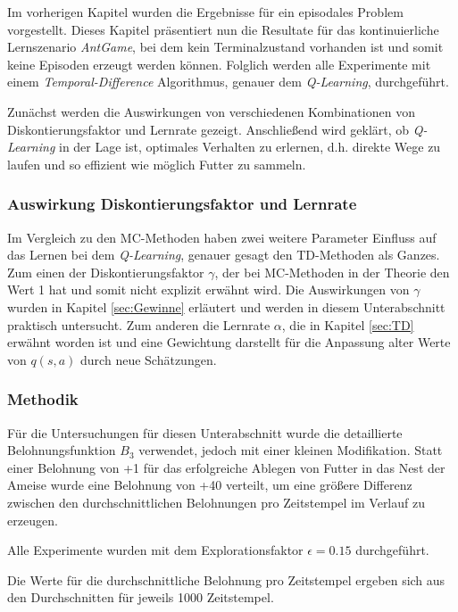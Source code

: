 Im vorherigen Kapitel wurden die Ergebnisse für ein episodales Problem vorgestellt. Dieses Kapitel präsentiert nun die Resultate für das kontinuierliche Lernszenario \textit{AntGame}, bei dem kein Terminalzustand vorhanden ist und somit keine Episoden erzeugt werden können. Folglich werden alle Experimente mit einem \textit{Temporal-Difference} Algorithmus, genauer dem \textit{Q-Learning}, durchgeführt. 
\par 
Zunächst werden die Auswirkungen von verschiedenen Kombinationen von Diskontierungsfaktor und Lernrate gezeigt. Anschließend wird geklärt, ob \textit{Q-Learning} in der Lage ist, optimales Verhalten zu erlernen, d.h. direkte Wege zu laufen und so effizient wie möglich Futter zu sammeln.


\subsubsection{Auswirkung Diskontierungsfaktor und Lernrate}
Im Vergleich zu den MC-Methoden haben zwei weitere Parameter Einfluss auf das Lernen bei dem \textit{Q-Learning}, genauer gesagt den TD-Methoden als Ganzes. Zum einen der Diskontierungsfaktor $\gamma$, der bei MC-Methoden in der Theorie den Wert 1 hat und somit nicht explizit erwähnt wird. Die Auswirkungen von $\gamma$ wurden in Kapitel \ref{sec:Gewinne} erläutert und werden in diesem Unterabschnitt praktisch untersucht. Zum anderen die Lernrate $\alpha$, die in Kapitel \ref{sec:TD} erwähnt worden ist und eine Gewichtung darstellt für die Anpassung alter Werte von $q(s,a)$ durch neue Schätzungen.

\subsubsection*{Methodik}
Für die Untersuchungen für diesen Unterabschnitt wurde die detaillierte Belohnungsfunktion $B_3$ verwendet, jedoch mit einer kleinen Modifikation. Statt einer Belohnung von +1 für das erfolgreiche Ablegen von Futter in das Nest der Ameise wurde eine Belohnung von +40 verteilt, um eine größere Differenz zwischen den durchschnittlichen Belohnungen pro Zeitstempel im Verlauf zu erzeugen.
\par 
Alle Experimente wurden mit dem Explorationsfaktor $\epsilon = 0.15$ durchgeführt.
\par 
Die Werte für die durchschnittliche Belohnung pro Zeitstempel ergeben sich aus den Durchschnitten für jeweils 1000 Zeitstempel.

